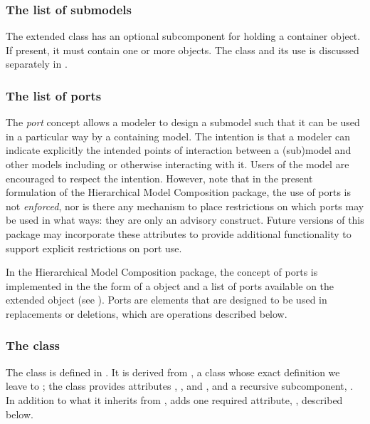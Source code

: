 \subsubsection{The list of submodels}

The extended \Model class has an optional 
subcomponent for holding a \ListOfSubmodels container object.  If
present, it must contain one or more \Submodel objects.  The \Submodel
class and its use is discussed separately in .


\subsubsection{The list of ports}

The \emph{port} concept allows a modeler to design a submodel such that
it can be used in a particular way by a containing model.  The intention
is that a modeler can indicate explicitly the intended points of
interaction between a (sub)model and other models including or otherwise
interacting with it.  Users of the model are encouraged to respect the
intention.  However, note that in the present formulation of the
Hierarchical Model Composition package, the use of ports is not
\emph{enforced}, nor is there any mechanism to place restrictions on
which ports may be used in what ways: they are only an advisory
construct.  Future versions of this package may incorporate these
attributes to provide additional functionality to support explicit
restrictions on port use.

In the Hierarchical Model Composition package, the concept of ports is
implemented in the the form of a \Port object and a list of ports
available on the extended \Model object (see ).
Ports are elements that are designed to be used in replacements or
deletions, which are operations described below.


\subsubsection{The  class}
\label{port-class}

The \Port class is defined in .  It is derived
from \SBaseRef, a class whose exact definition we leave to
; the class provides attributes ,
,  and , and a recursive
subcomponent, .  In addition to what it inherits from
\SBaseRef, \Port adds one required attribute, , described
below.

